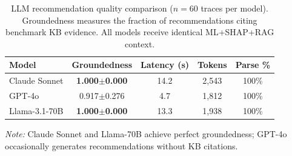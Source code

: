 \begin{table}[t]
\centering
\caption{LLM recommendation quality comparison ($n{=}60$ traces per model).
Groundedness measures the fraction of recommendations citing benchmark KB
evidence. All models receive identical ML+SHAP+RAG context.}
\label{tab:llm_quality}
\small
\begin{tabular}{lcccc}
\toprule
\textbf{Model} & \textbf{Groundedness} & \textbf{Latency (s)} & \textbf{Tokens} & \textbf{Parse \%} \\
\midrule
Claude Sonnet   & \textbf{1.000$\pm$0.000} & 14.2 & 2,543 & 100\% \\
GPT-4o          & 0.917$\pm$0.276          &  4.7 & 1,812 & 100\% \\
Llama-3.1-70B   & \textbf{1.000$\pm$0.000} & 13.3 & 1,938 & 100\% \\
\bottomrule
\end{tabular}
\vspace{1mm}
\raggedright
\footnotesize
\textit{Note:} Claude Sonnet and Llama-70B achieve perfect groundedness;
GPT-4o occasionally generates recommendations without KB citations.
\end{table}
